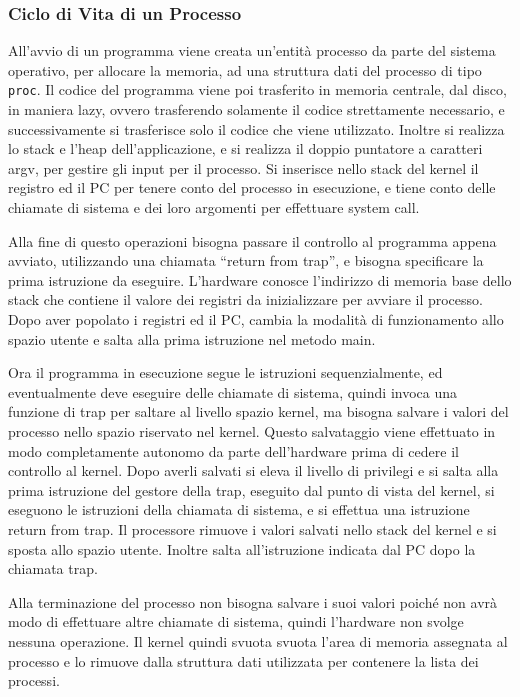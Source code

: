 \documentclass{article}
\numberwithin{equation}{subsection}
\begin{document}
\subsubsection{Ciclo di Vita di un Processo}

All'avvio di un programma viene creata un'entità processo da parte del sistema operativo, per allocare la memoria, ad una struttura dati del processo di tipo \verb|proc|. 
Il codice del programma viene poi trasferito in memoria centrale, dal disco, in maniera lazy, ovvero trasferendo solamente il codice strettamente 
necessario, e successivamente si trasferisce solo il codice che viene utilizzato. 
Inoltre si realizza lo stack e l'heap dell'applicazione, e si realizza il doppio puntatore a caratteri argv, per gestire gli input per il processo. Si inserisce nello 
stack del kernel il registro ed il PC per tenere conto del processo in esecuzione, e tiene conto delle chiamate di sistema e dei loro argomenti per effettuare system call. 

Alla fine di questo operazioni bisogna passare il controllo al programma appena avviato, utilizzando una chiamata ``return from trap'', e bisogna specificare la prima 
istruzione da eseguire. L'hardware conosce l'indirizzo di memoria base dello stack che contiene il valore dei registri da inizializzare per avviare il processo. Dopo 
aver popolato i registri ed il PC, cambia la modalità di funzionamento allo spazio utente e salta alla prima istruzione nel metodo main. 

Ora il programma in esecuzione segue le istruzioni sequenzialmente, ed eventualmente deve eseguire delle chiamate di sistema, quindi invoca una funzione di trap per 
saltare al livello spazio kernel, ma bisogna salvare i valori del processo nello spazio riservato nel kernel. Questo salvataggio viene effettuato in modo completamente autonomo 
da parte dell'hardware prima di cedere il controllo al kernel. Dopo averli salvati si eleva il livello di privilegi e si salta alla prima istruzione del gestore della trap, 
eseguito dal punto di vista del kernel, si eseguono le istruzioni della chiamata di sistema, e si effettua una istruzione return from trap. 
Il processore rimuove i valori salvati nello stack del kernel e si sposta allo spazio utente. Inoltre salta all'istruzione indicata dal PC dopo la chiamata trap. 

Alla terminazione del processo non bisogna salvare i suoi valori poiché non avrà modo di effettuare altre chiamate di sistema, quindi l'hardware non svolge nessuna 
operazione. Il kernel quindi svuota svuota l'area di memoria assegnata al processo e lo rimuove dalla struttura dati utilizzata per contenere la lista dei processi. 
\end{document}
